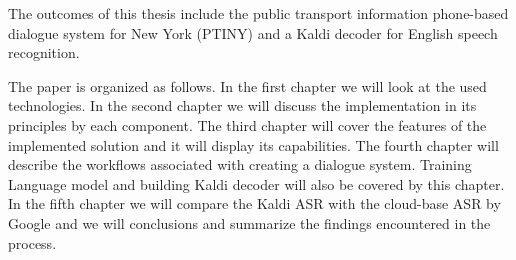 The outcomes of this thesis include the public transport information phone-based dialogue system for New York (\ac{PTINY}) and a Kaldi decoder for English speech recognition.

The paper is organized as follows.
In the first chapter we will look at the used technologies.
In the second chapter we will discuss the implementation in its principles by each component. %
The third chapter will cover the features of the implemented solution and it will display its capabilities.
The fourth chapter will describe the workflows associated with creating a dialogue system.
Training Language model and building Kaldi decoder will also be covered by this chapter.
In the fifth chapter we will compare the Kaldi \ac{ASR} with the cloud-base \ac{ASR} by Google and we will conclusions and summarize the findings encountered in the process.
















